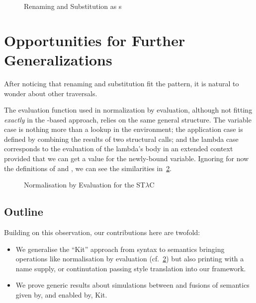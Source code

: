\begin{figure}[h]
\begin{minipage}{0.5\textwidth}
\end{minipage}
\begin{minipage}{0.5\textwidth}
\end{minipage}
\caption{Renaming and Substitution as s\label{rensubkits}}
\end{figure}

\section{Opportunities for Further Generalizations}

After noticing that renaming and substitution fit the pattern, it is
natural to wonder about other traversals.

The evaluation function used in normalization by evaluation, although
not fitting \emph{exactly} in the -based approach, relies on
the same general structure. The variable case is nothing more than a
lookup in the environment; the application case is defined by combining
the results of two structural calls; and the lambda case corresponds to
the evaluation of the lambda's body in an extended context provided that
we can get a value for the newly-bound variable. Ignoring for now the
definitions of  and , we can see the similarities
in~\cref{nbe}.

\begin{figure}[h]
\caption{Normalisation by Evaluation for the ST$λ$C\label{nbe}}
\end{figure}

\subsection{Outline} Building on this observation, our contributions
here are twofold:

\begin{itemize}
  \item
    We generalise the ``Kit'' approach from syntax to semantics bringing
    operations like normalisation by evaluation (cf.~\cref{nbe}) but also
    printing with a name supply, or continutation passing style translation
    into our framework.

  \item
    We prove generic results about simulations between and fusions of
    semantics given by, and enabled by, Kit.
\end{itemize}

